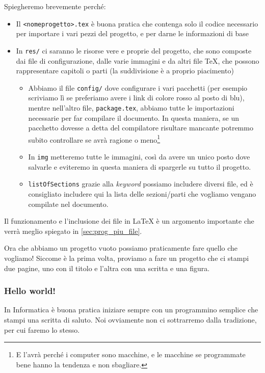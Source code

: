 Spiegheremo brevemente perché:
\begin{itemize}
  \item Il \texttt{<nomeprogetto>.tex} è buona pratica che contenga solo il
codice necessario per importare i vari pezzi del progetto, e per darne le
informazioni di base
  \item In \texttt{res/} ci saranno le risorse vere e proprie del progetto, che
sono composte dai file di configurazione, dalle varie immagini e da altri file
TeX, che possono rappresentare capitoli o parti (la suddivisione è a proprio
piacimento)
  \begin{itemize}
   \item Abbiamo il file \texttt{config/} dove configurare i vari pacchetti
(per esempio scriviamo lì se preferiamo avere i link di colore rosso al posto
di blu), mentre nell'altro file, \texttt{package.tex}, abbiamo tutte le
importazioni necessarie per far compilare il documento. In questa maniera, se
un pacchetto dovesse a detta del compilatore risultare mancante potremmo subito
controllare se avrà ragione o meno\footnote{E l'avrà perché i computer sono
macchine, e le macchine se programmate bene hanno la tendenza e non sbagliare.}
  \item In \texttt{img} metteremo tutte le immagini, così da avere un unico
posto dove salvarle e eviteremo in questa maniera di spargerle su tutto il
progetto.
  \item \texttt{listOfSections} grazie alla \textit{keyword} \verb!!
possiamo includere diversi file, ed è consigliato includere qui la lista delle
sezioni/parti che vogliamo vengano compilate nel documento.
  \end{itemize}
\end{itemize}

Il funzionamento e l'inclusione dei file in \LaTeX{} è un argomento importante
che verrà meglio spiegato in \ref{sec:prog_piu_file}.

Ora che abbiamo un progetto vuoto possiamo praticamente fare quello che
vogliamo! Siccome è la prima volta, proviamo a fare un progetto che ci stampi
due pagine, uno con il titolo e l'altra con una scritta e una figura.

\subsubsection{Hello world!}

In Informatica è buona pratica iniziare sempre con un programmino semplice che
stampi una scritta di saluto. Noi ovviamente non ci sottrarremo dalla
tradizione, per cui faremo lo stesso.

